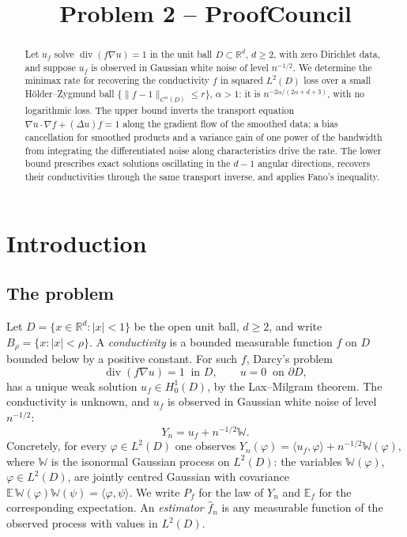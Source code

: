 \documentclass[12pt]{article}
\title{Problem 2 -- ProofCouncil}
\author{}
\date{}
\numberwithin{equation}{section}
\newcommand{\R}{\mathbb R}
\newcommand{\E}{\mathbb E}
\newcommand{\diver}{\operatorname{div}}
\begin{document}
\maketitle

\begin{abstract}
Let $u_f$ solve $\diver(f\nabla u)=1$ in the unit ball $D\subset\R^d$,
$d\ge2$, with zero Dirichlet data, and suppose $u_f$ is observed in
Gaussian white noise of level $n^{-1/2}$. We determine the minimax rate
for recovering the conductivity $f$ in squared $L^2(D)$ loss over a
small H\"older--Zygmund ball $\{\|f-1\|_{C^\alpha(D)}\le r\}$,
$\alpha>1$: it is $n^{-2\alpha/(2\alpha+d+3)}$, with no logarithmic
loss. The upper bound inverts the transport equation
$\nabla u\cdot\nabla f+(\Delta u)f=1$ along the gradient flow of the
smoothed data; a bias cancellation for smoothed products
and a variance gain of one power of the bandwidth from integrating the
differentiated noise along characteristics drive the rate. The lower
bound prescribes exact solutions oscillating in the $d-1$ angular
directions, recovers their conductivities through the same transport
inverse, and applies Fano's inequality.
\end{abstract}

\section{Introduction}

\subsection{The problem}

Let $D=\{x\in\R^d:|x|<1\}$ be the open unit ball, $d\ge2$, and write
$B_\rho=\{x:|x|<\rho\}$. A \emph{conductivity} is a bounded measurable
function $f$ on $D$ bounded below by a positive constant. For such
$f$, Darcy's problem
\begin{equation}\label{eq:pde}
 \diver(f\nabla u)=1\ \text{ in }D,\qquad u=0\ \text{ on }\partial D,
\end{equation}
has a unique weak solution $u_f\in H^1_0(D)$, by the Lax--Milgram
theorem. The conductivity is unknown, and $u_f$ is observed in Gaussian
white noise of level $n^{-1/2}$:
\begin{equation}\label{eq:model}
 Y_n=u_f+n^{-1/2}\mathbb W .
\end{equation}
Concretely, for every $\varphi\in L^2(D)$ one observes
$Y_n(\varphi)=\langle u_f,\varphi\rangle+n^{-1/2}\mathbb W(\varphi)$,
where $\mathbb W$ is the isonormal Gaussian process on $L^2(D)$: the
variables $\mathbb W(\varphi)$, $\varphi\in L^2(D)$, are jointly
centred Gaussian with covariance
$\E\,\mathbb W(\varphi)\mathbb W(\psi)=\langle\varphi,\psi\rangle$.
We write $P_f$ for the law of $Y_n$ and $\E_f$ for the corresponding
expectation. An \emph{estimator} $\widehat f_n$ is any measurable
function of the observed process with values in $L^2(D)$.
\end{document}
